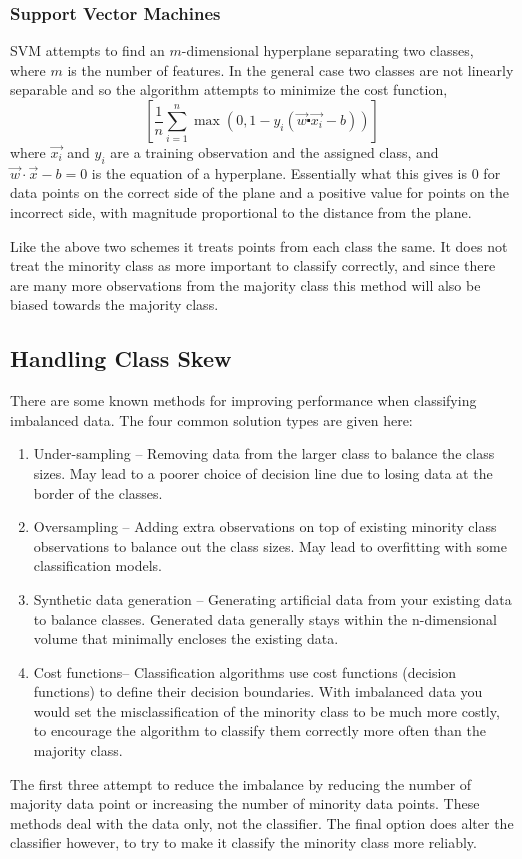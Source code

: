 \documentclass{article}
\begin{document}
\subsubsection{Support Vector Machines}
SVM attempts to find an $m$-dimensional hyperplane separating two classes, where $m$ is the number of features.
In the general case two classes are not linearly separable and so the algorithm attempts to minimize the cost function,
\begin{equation}
	\left[\frac{1}{n}\sum_{i=1}^{n}\max(0,1-y_{i}(\overrightarrow{w}\centerdot\overrightarrow{x_{i}}-b))\right]
\end{equation}
where $\overrightarrow{x_{i}}$ and $y_{i}$ are a training observation and the assigned class, and $\vec{w} \cdot {\vec {x}}-b=0$ is the equation of a hyperplane. Essentially what this gives is 0 for data points on the correct side of the plane and a positive value for points on the incorrect side, with magnitude proportional to the distance from the plane.

Like the above two schemes it treats points from each class the same. It does not treat the minority class as more important to classify correctly, and since there are many more observations from the majority class this method will also be biased towards the majority class.

\subsection{Handling Class Skew}
There are some known methods for improving performance when classifying imbalanced data. The four common solution types are given here:
\begin{enumerate}
\item Under-sampling -- Removing data from the larger class to balance the class sizes.
May lead to a poorer choice of decision line due to losing data at the border of the classes.
\item Oversampling -- Adding extra observations on top of existing minority class observations to balance out the class sizes.
May lead to overfitting with some classification models.
\item Synthetic data generation -- Generating artificial data from your existing data to balance classes.
Generated data generally stays within the n-dimensional volume that minimally encloses the existing data.
\item Cost functions-- Classification algorithms use cost functions (decision functions) to define their decision boundaries.
With imbalanced data you would set the misclassification of the minority class to be much more costly, to encourage the algorithm to classify them correctly more often than the majority class.
\end{enumerate}
The first three attempt to reduce the imbalance by reducing the number of majority data point or increasing the number of minority data points.
These methods deal with the data only, not the classifier.
The final option does alter the classifier however, to try to make it classify the minority class more reliably.
\end{document}
